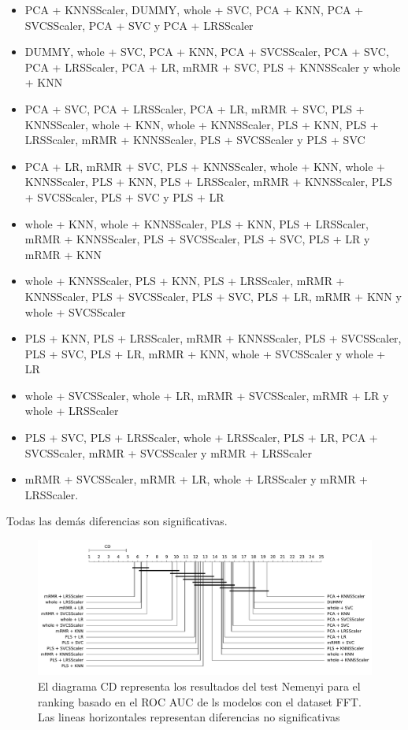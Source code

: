 \documentclass[a4paper,oneside,11pt,leqno]{article}
\begin{document}
	\begin{itemize}
		\item PCA + KNNSScaler, DUMMY, whole + SVC, PCA + KNN, PCA + SVCSScaler, PCA + SVC y PCA + LRSScaler

		\item DUMMY, whole + SVC, PCA + KNN, PCA + SVCSScaler, PCA + SVC, PCA + LRSScaler, PCA + LR, mRMR + SVC, PLS + KNNSScaler y whole + KNN

		\item  PCA + SVC, PCA + LRSScaler, PCA + LR, mRMR + SVC, PLS + KNNSScaler, whole + KNN, whole + KNNSScaler, PLS + KNN, PLS + LRSScaler, mRMR + KNNSScaler, PLS + SVCSScaler y PLS + SVC

		\item PCA + LR, mRMR + SVC, PLS + KNNSScaler, whole + KNN, whole + KNNSScaler, PLS + KNN, PLS + LRSScaler, mRMR + KNNSScaler, PLS + SVCSScaler, PLS + SVC y PLS + LR

		\item whole + KNN, whole + KNNSScaler, PLS + KNN, PLS + LRSScaler, mRMR + KNNSScaler, PLS + SVCSScaler, PLS + SVC, PLS + LR y mRMR + KNN

		\item whole + KNNSScaler, PLS + KNN, PLS + LRSScaler, mRMR + KNNSScaler, PLS + SVCSScaler, PLS + SVC, PLS + LR, mRMR + KNN y whole + SVCSScaler

		\item PLS + KNN, PLS + LRSScaler, mRMR + KNNSScaler, PLS + SVCSScaler, PLS + SVC, PLS + LR, mRMR + KNN, whole + SVCSScaler y whole + LR

		\item whole + SVCSScaler, whole + LR, mRMR + SVCSScaler, mRMR + LR y whole + LRSScaler

		\item PLS + SVC, PLS + LRSScaler, whole + LRSScaler, PLS + LR, PCA + SVCSScaler, mRMR + SVCSScaler y mRMR + LRSScaler

		\item mRMR + SVCSScaler, mRMR + LR, whole + LRSScaler y mRMR + LRSScaler.
	\end{itemize}

	Todas las demás diferencias son significativas.

	\begin{figure}[h]
		\includegraphics[width=\linewidth]{stat_results_fft.pdf}
		\caption{El diagrama CD representa los resultados del test Nemenyi para el ranking basado en el ROC AUC de ls modelos con el dataset FFT. Las lineas horizontales representan diferencias no significativas}
		\label{fig:stats_fig_fft}
	\end{figure}
\end{document}
